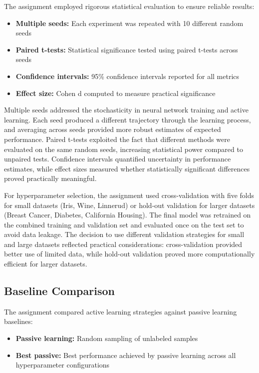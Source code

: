 \documentclass[conference]{IEEEtran}
\begin{document}
The assignment employed rigorous statistical evaluation to ensure reliable results:

\begin{itemize}
\item \textbf{Multiple seeds:} Each experiment was repeated with 10 different random seeds
\item \textbf{Paired t-tests:} Statistical significance tested using paired t-tests across seeds
\item \textbf{Confidence intervals:} 95\% confidence intervals reported for all metrics
\item \textbf{Effect size:} Cohen d computed to measure practical significance
\end{itemize}

Multiple seeds addressed the stochasticity in neural network training and active learning. Each seed produced a different trajectory through the learning process, and averaging across seeds provided more robust estimates of expected performance. Paired t-tests exploited the fact that different methods were evaluated on the same random seeds, increasing statistical power compared to unpaired tests. Confidence intervals quantified uncertainty in performance estimates, while effect sizes measured whether statistically significant differences proved practically meaningful.

For hyperparameter selection, the assignment used cross-validation with five folds for small datasets (Iris, Wine, Linnerud) or hold-out validation for larger datasets (Breast Cancer, Diabetes, California Housing). The final model was retrained on the combined training and validation set and evaluated once on the test set to avoid data leakage. The decision to use different validation strategies for small and large datasets reflected practical considerations: cross-validation provided better use of limited data, while hold-out validation proved more computationally efficient for larger datasets.

\subsection{Baseline Comparison}

The assignment compared active learning strategies against passive learning baselines:

\begin{itemize}
\item \textbf{Passive learning:} Random sampling of unlabeled samples
\item \textbf{Best passive:} Best performance achieved by passive learning across all hyperparameter configurations
\end{itemize}
\end{document}
